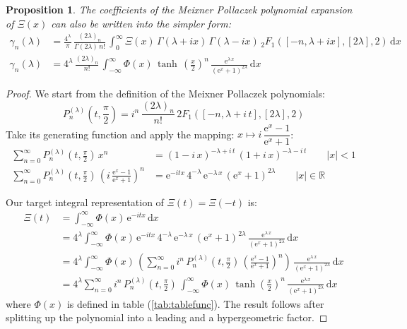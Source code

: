 \documentclass[a4paper,11pt,twoside]{amsart}
\newtheorem{proposition}[theorem]{Proposition}
\begin{document}
\begin{proposition}
The coefficients of the Meixner Pollaczek polynomial expansion of $\Xi(x)$ can also be written into the simpler form:   
\begin{align}
\gamma_n(\lambda) &= \frac{4^\lambda}{\pi}\,\frac{(2\lambda)_n}{\Gamma(2\lambda)\,n!}\,\int_{0}^{\infty} \Xi(x)\,\Gamma(\lambda+ix)\,\Gamma(\lambda-ix)\,{}_2F_1([-n,\lambda+ix],[2\lambda],2)\,\mathrm{d}x \\
\gamma_n(\lambda) &= 4^\lambda\,\frac{(2\lambda)_n}{n!}\,\int_{-\infty}^{\infty} \Phi(x)\,\tanh\,\left(\frac{x}{2}\right)^n\,\frac{\textrm{e}^{\lambda\,x}}{(\textrm{e}^x+1)^{2\lambda}}\,\mathrm{d}x
\end{align}
\end{proposition}
\begin{proof}
We start from the definition of the Meixner Pollaczek polynomials:
\begin{equation}
  P_n^{(\lambda)}\left(t,\frac{\pi}{2}\right) = i^n\,\frac{(2\lambda)_n}{n!}\,{}2F_1\left([-n, \lambda+i\,t],[2\lambda],2\right)
\end{equation}
Take its generating function and apply the mapping: $x \mapsto i\,\dfrac{\textrm{e}^x-1}{\textrm{e}^x+1}$:
\begin{align}
 \sum_{n=0}^\infty P_n^{(\lambda)}\left(t,\frac{\pi}{2}\right)\,x^n &= (1-i\,x)^{-\lambda+i\,t}\,(1+i\,x)^{-\lambda-i\,t} \qquad |x| < 1 \\
 \sum_{n=0}^\infty P_n^{(\lambda)}\left(t,\frac{\pi}{2}\right)\,\left(i\,\frac{\textrm{e}^x-1}{\textrm{e}^x+1}\right)^n &= \textrm{e}^{-itx}\,4^{-\lambda}\, \textrm{e}^{-\lambda\,x}\,(\textrm{e}^x+1)^{2\lambda} \qquad |x| \in \mathbb{R}
\end{align}

Our target integral representation of $\Xi(t) = \Xi(-t)$ is:
\begin{align}
 \Xi(t) &= \int_{-\infty}^\infty \Phi(x)\,\textrm{e}^{-itx}\, \mathrm{d}x \\
 &=4^\lambda \int_{-\infty}^\infty \Phi(x)\,\textrm{e}^{-itx}\,4^{-\lambda}\, \textrm{e}^{-\lambda\,x}\,(\textrm{e}^x+1)^{2\lambda}\,\frac{\textrm{e}^{\lambda\,x}}{(\textrm{e}^x+1)^{2\lambda}} \,\mathrm{d}x \\
 &=4^\lambda \int_{-\infty}^\infty \Phi(x)\,\left(\sum_{n=0}^\infty i^n\,P_n^{(\lambda)}\left(t,\frac{\pi}{2}\right)\,\left(\frac{\textrm{e}^x-1}{\textrm{e}^x+1}\right)^n\right)\,\frac{\textrm{e}^{\lambda\,x}}{(\textrm{e}^x+1)^{2\lambda}} \, \mathrm{d}x \\
 &=4^\lambda \sum_{n=0}^\infty i^n\,P_n^{(\lambda)}\left(t,\frac{\pi}{2}\right)\,\int_{-\infty}^\infty \Phi(x)\,\tanh\left(\frac{x}{2}\right)^n\,\frac{\textrm{e}^{\lambda\,x}}{(\textrm{e}^x+1)^{2\lambda}}\, \mathrm{d}x \label{meixner}
\end{align}
where $\Phi(x)$ is defined in table (\ref{tab:tablefunc}). The result follows after splitting up the polynomial into a leading and a hypergeometric factor.
\end{proof}
\end{document}
